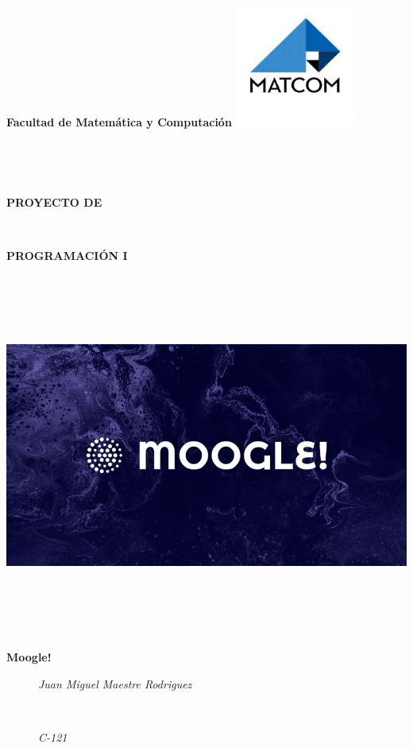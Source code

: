\documentclass{article}
\begin{document}
\begin{flushright}
        {\scriptsize \textbf{Facultad de Matemática y Computación}}
        \includegraphics[width=4cm, height=4cm]{matcom.jpg}\\
    \end{flushright}
    
    \
    
    \
    
    \begin{center}
        \textbf{{\Huge PROYECTO DE }}
        
        \
    
        \textbf{{\Huge PROGRAMACIÓN I}}
        \
    
        \
         
        \
        
        \
        \includegraphics[width = 10 cm ,height= 5 cm]{Screenshot 2023-07-17 at 15-44-54 The Logo Maker Built for 1000 Industries and 20M Users.png}\\
        \
    
        \
    
        \
    
        \textbf{{\Huge Moogle!}}
    \end{center}
    \begin{figure}[b]
        \begin{flushleft}
          \textit{\large Juan Miguel Maestre Rodriguez }
    
            \
        
            \textit{\large C-121}
        \end{flushleft}
    \end{figure}
    
\end{document}
